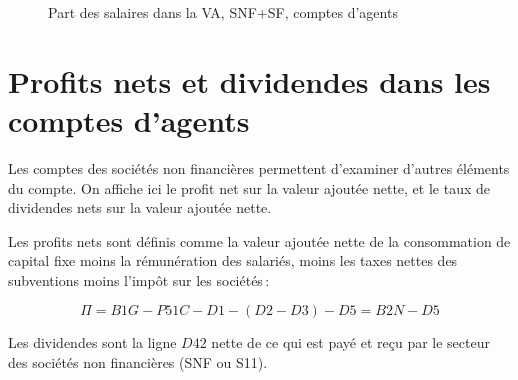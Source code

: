\documentclass[
  french,
  9pt,
  a4paper,
]{article}
\begin{document}
\begin{figure}[H]

\caption{\label{fig-s1112psal}Part des salaires dans la VA, SNF+SF,
comptes d'agents}


\end{figure}%

\section{Profits nets et dividendes dans les comptes
d'agents}\label{profits-nets-et-dividendes-dans-les-comptes-dagents}

Les comptes des sociétés non financières permettent d'examiner d'autres
éléments du compte. On affiche ici le profit net sur la valeur ajoutée
nette, et le taux de dividendes nets sur la valeur ajoutée nette.

Les profits nets sont définis comme la valeur ajoutée nette de la
consommation de capital fixe moins la rémunération des salariés, moins
les taxes nettes des subventions moins l'impôt sur les sociétés\,:

\[
\Pi = B1G - P51C - D1 - (D2-D3) - D5 = B2N-D5
\]

Les dividendes sont la ligne \(D42\) nette de ce qui est payé et reçu
par le secteur des sociétés non financières (SNF ou S11).
\end{document}
